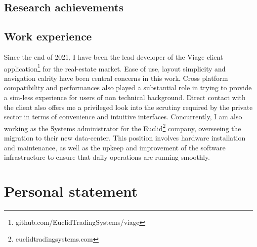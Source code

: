 \documentclass[journal,onecolumn]{IEEEtran}
\begin{document}
\subsection{Research achievements} %

\subsection{Work experience} %
Since the end of 2021, I have been the lead developer of the Viage client application\footnote{github.com/EuclidTradingSystems/viage} for the real-estate market. Ease of use, layout simplicity and navigation calrity have been central concerns in this work. Cross platform compatibility and performances also played a substantial role in trying to provide a sim-less experience for users of non technical background. Direct contact with the client also offers me a privileged look into the scrutiny required by the private sector in terms of convenience and intuitive interfaces. Concurrently, I am also working as the Systems administrator for the Euclid\footnote{euclidtradingsystems.com} company, overseeing the migration to their new data-center. This position involves hardware installation and maintenance, as well as the upkeep and improvement of the software infrastructure to ensure that daily operations are running smoothly. 

\section{Personal statement} %
\end{document}
